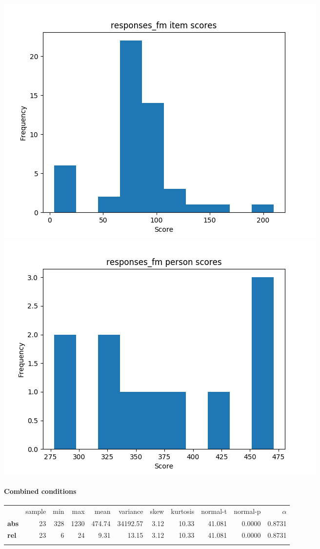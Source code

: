 \documentclass[]{article}
\begin{document}
\includegraphics{responses_fm_diff.png}
\includegraphics{responses_fm_abil.png}

\FloatBarrier
\paragraph{Combined conditions}\label{combined-conditions}

\begin{longtable}[c]{@{}lrrrrrrrrrr@{}}
\toprule\addlinespace
& sample & min & max & mean & variance & skew & kurtosis & normal-t &
normal-p & $\alpha$
\\\addlinespace
\midrule\endhead
\textbf{abs} & 23 & 328 & 1230 & 474.74 & 34192.57 & 3.12 & 10.33 &
41.081 & 0.0000 & 0.8731
\\\addlinespace
\textbf{rel} & 23 & 6 & 24 & 9.31 & 13.15 & 3.12 & 10.33 & 41.081 &
0.0000 & 0.8731
\\\addlinespace
\bottomrule
\end{longtable}
\end{document}
